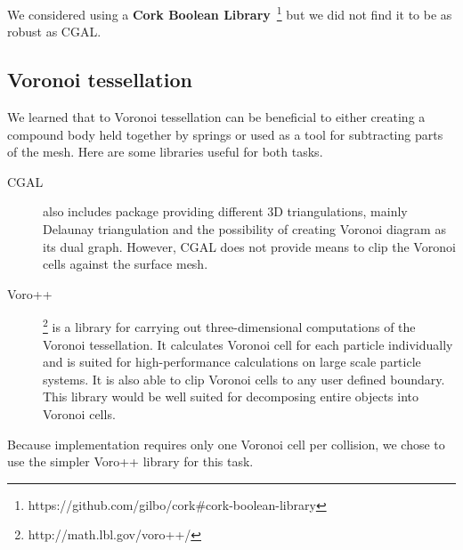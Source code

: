 
We considered using a \textbf{Cork Boolean Library}~\footnote{https://github.com/gilbo/cork\#cork-boolean-library} but we did not find it to be as robust as CGAL. 

\subsection{Voronoi tessellation}
We learned that to Voronoi tessellation can be beneficial to either creating a compound body held together by springs or used as a tool for subtracting parts of the mesh. Here are some libraries useful for both tasks.

\begin{description}
\item[CGAL] also includes package providing different 3D triangulations, mainly Delaunay triangulation and the possibility of creating Voronoi diagram as its dual graph. However, CGAL does not provide means to clip the Voronoi cells against the surface mesh.

\item[Voro++]\footnote{http://math.lbl.gov/voro++/} is a library for carrying out three-dimensional computations of the Voronoi tessellation. It calculates Voronoi cell for each particle individually and is suited for high-performance calculations on large scale particle systems. It is also able to clip Voronoi cells to any user defined boundary. This library would be well suited for decomposing entire objects into Voronoi cells. 
\end{description}


Because implementation requires only one Voronoi cell per collision, we chose to use the simpler Voro++ library for this task. 

